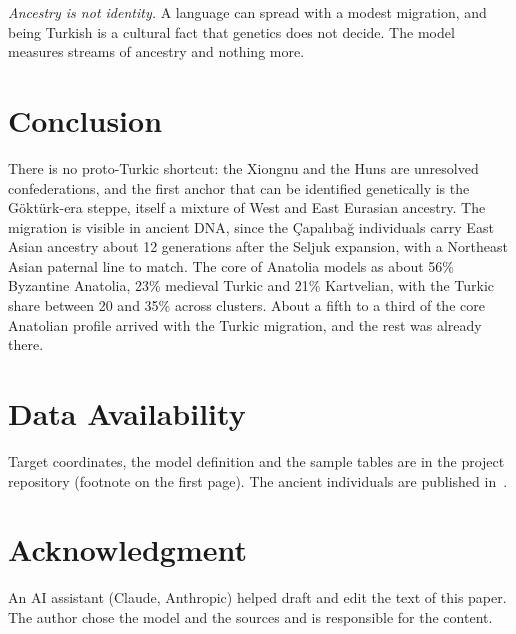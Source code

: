 \documentclass[conference,a4paper]{IEEEtran}
\begin{document}
\textit{Ancestry is not identity.} A language can spread with a modest migration, and being Turkish is a cultural fact that genetics does not decide. The model measures streams of ancestry and nothing more.

\section{Conclusion}
There is no proto-Turkic shortcut: the Xiongnu and the Huns are unresolved confederations, and the first anchor that can be identified genetically is the Göktürk-era steppe, itself a mixture of West and East Eurasian ancestry. The migration is visible in ancient DNA, since the Çapalıbağ individuals carry East Asian ancestry about 12 generations after the Seljuk expansion, with a Northeast Asian paternal line to match. The core of Anatolia models as about 56\% Byzantine Anatolia, 23\% medieval Turkic and 21\% Kartvelian, with the Turkic share between 20 and 35\% across clusters. About a fifth to a third of the core Anatolian profile arrived with the Turkic migration, and the rest was already there.

\section*{Data Availability}
Target coordinates, the model definition and the sample tables are in the project repository (footnote on the first page). The ancient individuals are published in~\cite{lazaridis2022,damgaard2018steppes,damgaard2018horse,jeong2020}.

\section*{Acknowledgment}
An AI assistant (Claude, Anthropic) helped draft and edit the text of this paper. The author chose the model and the sources and is responsible for the content.



\end{document}
